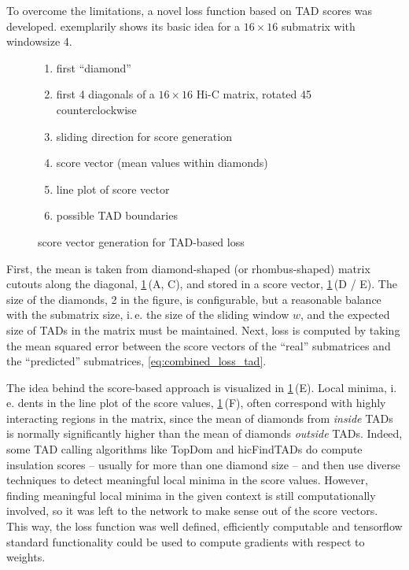 To overcome the limitations, a novel loss function based on TAD scores \cite{Crane2015} was developed.
 exemplarily shows its basic idea for a $16\times16$ submatrix
with windowsize 4.
\begin{figure}[hbt]
 \begin{minipage}{0.65\textwidth}
    \caption{score vector generation for TAD-based loss}
    \label{fig:improve:tad_score_loss_function}
 \end{minipage}\hfill
 \begin{minipage}{0.3\textwidth}
 \scriptsize
  \begin{enumerate}[label=\Alph*:,leftmargin=*]
   \raggedright
    \item first ``diamond''
    \item first 4 diagonals of a $16\times16$ Hi-C matrix, rotated \SI{45}{\deg} counterclockwise
    \item sliding direction for score generation
    \item score vector (mean values within diamonds)
    \item line plot of score vector
    \item possible TAD boundaries
\end{enumerate}
 \end{minipage}
\end{figure}
First, the mean is taken from diamond-shaped (or rhombus-shaped) matrix cutouts along the diagonal, \cref{fig:improve:tad_score_loss_function}\,(A, C),
and stored in a score vector, \cref{fig:improve:tad_score_loss_function}\,(D / E). 
The size of the diamonds, 2 in the figure, is configurable, but a reasonable balance with the submatrix size, i.\,e. the size of the sliding window $w$,
and the expected size of TADs in the matrix must be maintained.
Next, loss is computed by taking the mean squared error between the score vectors of the ``real'' submatrices and the ``predicted'' submatrices, \cref{eq:combined_loss_tad}.

The idea behind the score-based approach is visualized in \cref{fig:improve:tad_score_loss_function}\,(E).
Local minima, i.\,e. dents in the line plot of the score values, \cref{fig:improve:tad_score_loss_function}\,(F),
often correspond with highly interacting regions in the matrix, since the mean of diamonds from \emph{inside} TADs is normally significantly higher than the mean of diamonds \emph{outside} TADs.
Indeed, some TAD calling algorithms like TopDom \cite{Shin2015} and hicFindTADs \cite[W12f.]{Wolff2018} do compute insulation scores -- usually for more than one diamond size -- 
and then use diverse techniques to detect meaningful local minima in the score values.
However, finding meaningful local minima in the given context is still computationally involved,
so it was left to the network to make sense out of the score vectors.
This way, the loss function was well defined, efficiently computable and tensorflow standard functionality could be used to compute gradients with respect to weights.

